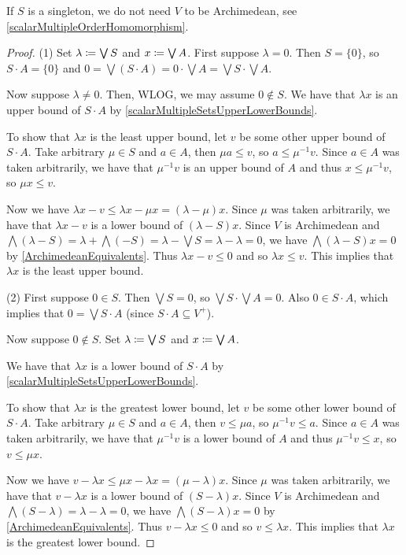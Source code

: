 If $S$ is a singleton, we do not need $V$ to be Archimedean, see \ref{scalarMultipleOrderHomomorphism}.
\begin{proof}
(1) Set $\lambda \coloneqq \bigvee S$ and $x \coloneqq \bigvee A$. First suppose $\lambda = 0$. Then $S = \{0\}$, so $S\cdot A = \{0\}$ and $0 = \bigvee(S\cdot A) = 0\cdot \bigvee A = \bigvee S \cdot \bigvee A$.

Now suppose $\lambda \neq 0$. Then, WLOG, we may assume $0\notin S$. We have that $\lambda x$ is an upper bound of $S\cdot A$ by \ref{scalarMultipleSetsUpperLowerBounds}.

To show that $\lambda x$ is the least upper bound, let $v$ be some other upper bound of $S\cdot A$. Take arbitrary $\mu\in S$ and $a\in A$, then $\mu a \leq v$, so $a \leq \mu^{-1}v$. Since $a\in A$ was taken arbitrarily, we have that $\mu^{-1}v$ is an upper bound of $A$ and thus $x \leq \mu^{-1}v$, so $\mu x\leq v$.

Now we have $\lambda x - v \leq \lambda x - \mu x = (\lambda - \mu) x$. Since $\mu$ was taken arbitrarily, we have that $\lambda x - v$ is a lower bound of $(\lambda - S)x$. Since $V$ is Archimedean and $\bigwedge (\lambda - S) = \lambda + \bigwedge (-S) = \lambda - \bigvee S = \lambda - \lambda = 0$, we have $\bigwedge (\lambda - S)x = 0$ by \ref{ArchimedeanEquivalents}. Thus $\lambda x - v \leq 0$ and so $\lambda x \leq v$. This implies that $\lambda x$ is the least upper bound.

(2) First suppose $0\in S$. Then $\bigvee S = 0$, so $\bigvee S \cdot \bigvee A = 0$. Also $0\in S\cdot A$, which implies that $0 = \bigvee S\cdot A$ (since $S\cdot A \subseteq V^+$).

Now suppose $0\notin S$. Set $\lambda \coloneqq \bigvee S$ and $x\coloneqq \bigvee A$.

We have that $\lambda x$ is a lower bound of $S\cdot A$ by \ref{scalarMultipleSetsUpperLowerBounds}.

To show that $\lambda x$ is the greatest lower bound, let $v$ be some other lower bound of $S\cdot A$. Take arbitrary $\mu\in S$ and $a\in A$, then $v \leq \mu a$, so $\mu^{-1}v \leq a$. Since $a\in A$ was taken arbitrarily, we have that $\mu^{-1}v$ is a lower bound of $A$ and thus $\mu^{-1}v \leq x$, so $v \leq \mu x$.

Now we have $v - \lambda x \leq \mu x - \lambda x = (\mu - \lambda) x$. Since $\mu$ was taken arbitrarily, we have that $v - \lambda x$ is a lower bound of $(S - \lambda)x$. Since $V$ is Archimedean and $\bigwedge (S - \lambda) = \lambda - \lambda = 0$, we have $\bigwedge (S - \lambda)x = 0$ by \ref{ArchimedeanEquivalents}. Thus $v - \lambda x \leq 0$ and so $v \leq \lambda x$. This implies that $\lambda x$ is the greatest lower bound.
\end{proof}


